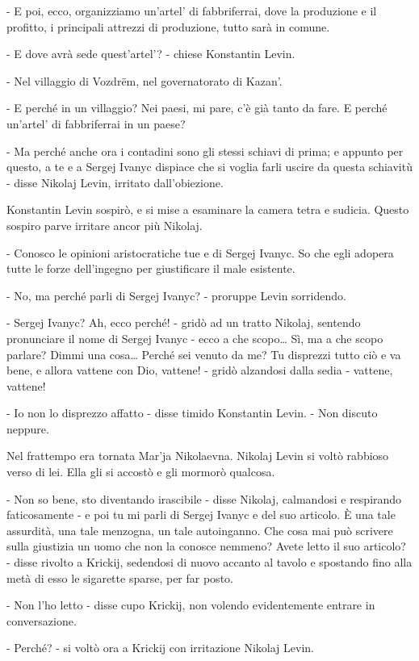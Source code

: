 - E poi, ecco, organizziamo un'artel' di fabbriferrai, dove la produzione e il profitto, i principali attrezzi di produzione, tutto sarà in comune. 

- E dove avrà sede quest'artel'? - chiese Konstantin Levin. 

- Nel villaggio di Vozdrëm, nel governatorato di Kazan'. 

- E perché in un villaggio? Nei paesi, mi pare, c'è già tanto da fare. E perché un'artel' di fabbriferrai in un paese? 

- Ma perché anche ora i contadini sono gli stessi schiavi di prima; e appunto per questo, a te e a Sergej Ivanyc dispiace che si voglia farli uscire da questa schiavitù - disse Nikolaj Levin, irritato dall'obiezione. 

Konstantin Levin sospirò, e si mise a esaminare la camera tetra e sudicia. Questo sospiro parve irritare ancor più Nikolaj. 

- Conosco le opinioni aristocratiche tue e di Sergej Ivanyc. So che egli adopera tutte le forze dell'ingegno per giustificare il male esistente. 

- No, ma perché parli di Sergej Ivanyc? - proruppe Levin sorridendo. 

- Sergej Ivanyc? Ah, ecco perché! - gridò ad un tratto Nikolaj, sentendo pronunciare il nome di Sergej Ivanyc - ecco a che scopo\ldots{} Sì, ma a che scopo parlare? Dimmi una cosa\ldots{} Perché sei venuto da me? Tu disprezzi tutto ciò e va bene, e allora vattene con Dio, vattene! - gridò alzandosi dalla sedia - vattene, vattene! 

- Io non lo disprezzo affatto - disse timido Konstantin Levin. - Non discuto neppure. 

Nel frattempo era tornata Mar'ja Nikolaevna. Nikolaj Levin si voltò rabbioso verso di lei. Ella gli si accostò e gli mormorò qualcosa. 

- Non so bene, sto diventando irascibile - disse Nikolaj, calmandosi e respirando faticosamente - e poi tu mi parli di Sergej Ivanyc e del suo articolo. È una tale assurdità, una tale menzogna, un tale autoinganno. Che cosa mai può scrivere sulla giustizia un uomo che non la conosce nemmeno? Avete letto il suo articolo? - disse rivolto a Krickij, sedendosi di nuovo accanto al tavolo e spostando fino alla metà di esso le sigarette sparse, per far posto. 

- Non l'ho letto - disse cupo Krickij, non volendo evidentemente entrare in conversazione. 

- Perché? - si voltò ora a Krickij con irritazione Nikolaj Levin. 


